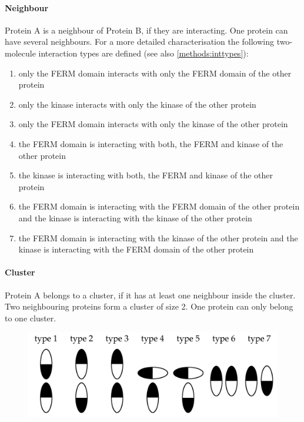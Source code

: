 \paragraph{Neighbour} Protein A is a neighbour of Protein B, if they are interacting. One protein can have several neighbours. For a more detailed characterisation the following two-molecule interaction types are defined (see also \autoref{methods:inttypes}):
\begin{enumerate}[label={type \theenumi:}, leftmargin=*]
	\item only the FERM domain interacts with only the FERM domain of the other protein
	\item only the kinase interacts with only the kinase of the other protein
	\item only the FERM domain interacts with only the kinase of the other protein
	\item the FERM domain is interacting with both, the FERM and kinase of the other protein
	\item the kinase is interacting with both, the FERM and kinase of the other protein
	\item the FERM domain is interacting with the FERM domain of the other protein and the kinase is interacting with the kinase of the other protein
	\item the FERM domain is interacting with the kinase of the other protein and the kinase is interacting with the FERM domain of the other protein
\end{enumerate}
\paragraph{Cluster} Protein A belongs to a cluster, if it has at least one neighbour inside the cluster. Two neighbouring proteins form a cluster of size 2. One protein can only belong to one cluster.
%
%
%
\begin{figure}
	\centering
	\includegraphics[width=\textwidth]{figures/introduction/classification}
	\label{methods:inttypes}
\end{figure}
%
%
%
